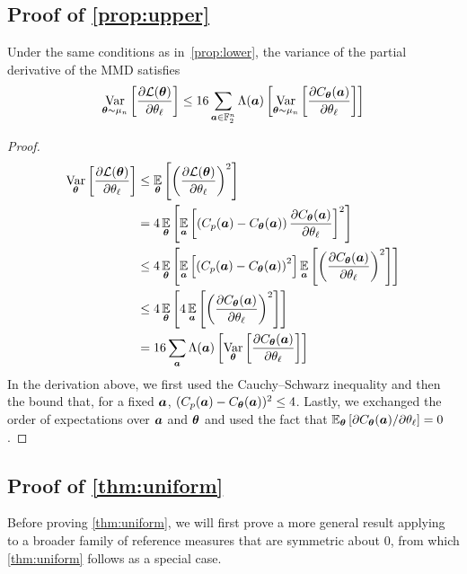 \documentclass{article}
\theoremstyle{plain}
\theoremstyle{definition}
\theoremstyle{remark}
\begin{document}
\subsection{Proof of \cref{prop:upper}}
Under the same conditions as in~\cref{prop:lower}, the variance of the partial derivative of the MMD satisfies
\begin{equation*}
    \operatorname*{Var}_{{\bm{\theta}} \sim\mu_n} \left[ \frac{\partial \mathcal{L}({\bm{\theta}})}{\partial \theta_\ell} \right] \leq 16 \sum_{{\bm{a}}\in \mathbb{F}_2^n} \Lambda({\bm{a}})\left[  \operatorname*{Var}_{{\bm{\theta}}\sim\mu_n} \left[ \frac{\partial C_{\bm{\theta}}({\bm{a}})}{\partial \theta_\ell} \right]\right]
\end{equation*}
\begin{proof}
\begin{align*}
\operatorname*{Var}_{{\bm{\theta}}} \left[ \frac{\partial \mathcal{L}({\bm{\theta}})}{\partial \theta_\ell} \right] &\leq \operatorname*{\mathbb{E}}_{{\bm{\theta}}} \left[ \left(\frac{\partial \mathcal{L}({\bm{\theta}})}{\partial \theta_\ell} \right)^2 \right] \\
&= 4\operatorname*{\mathbb{E}}_{{\bm{\theta}}} \left[  \operatorname*{\mathbb{E}}_{{\bm{a}}}\left[\left( C_p({\bm{a}}) - C_{\bm{\theta}}({\bm{a}}) \right) \frac{\partial C_{\bm{\theta}}({\bm{a}})}{\partial \theta_\ell} \right]^2  \right]\\
&\leq 4\operatorname*{\mathbb{E}}_{{\bm{\theta}}} \left[  \operatorname*{\mathbb{E}}_{{\bm{a}}}\left[\left( C_p({\bm{a}}) - C_{\bm{\theta}}({\bm{a}}) \right)^2 \right] \operatorname*{\mathbb{E}}_{{\bm{a}}}\left[\left(\frac{\partial C_{\bm{\theta}}({\bm{a}})}{\partial \theta_\ell} \right)^2\right]\right]\\
&\leq 4\operatorname*{\mathbb{E}}_{{\bm{\theta}}} \left[  4 \operatorname*{\mathbb{E}}_{{\bm{a}}}\left[\left(\frac{\partial C_{\bm{\theta}}({\bm{a}})}{\partial \theta_\ell} \right)^2\right]\right]\\
&= 16 \sum_{\bm{a}} \Lambda({\bm{a}})\left[  \operatorname*{Var}_{{\bm{\theta}}} \left[ \frac{\partial C_{\bm{\theta}}({\bm{a}})}{\partial \theta_\ell} \right]\right]
\end{align*}
In the derivation above, we first used the Cauchy--Schwarz inequality and then the bound that, for a fixed ${\bm{a}}$, $(C_p({\bm{a}}) - C_{\bm{\theta}}({\bm{a}}))^2 \leq 4$. Lastly, we exchanged the order of expectations over ${\bm{a}}$ and ${\bm{\theta}}$ and used the fact that $\operatorname*{\mathbb{E}}_{{\bm{\theta}}}\left[\partial C_{\bm{\theta}}({\bm{a}}) / \partial \theta_\ell\right] = 0$.
\end{proof}


\subsection{Proof of \cref{thm:uniform}}
Before proving \cref{thm:uniform}, we will first prove a more general result applying to a broader family of reference measures that are symmetric about $0$, from which \cref{thm:uniform} follows as a special case.
\end{document}
